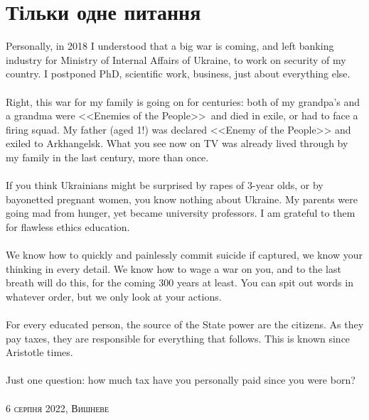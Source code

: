 \section{Тільки одне питання}

Personally, in 2018 I understood that a big war is coming, and left banking
industry for Ministry of Internal Affairs of Ukraine, to work on security
of my country. I postponed PhD, scientific work, business, just about everything else.
\\
\\
Right, this war for my family is going on for centuries: both of my
grandpa's and a grandma were <<Enemies of the People>>\, and died in exile,
or had to face a firing squad. My father (aged 1!) was
declared <<Enemy of the People>> and exiled to Arkhangelsk.
What you see now on TV was already lived through by my family in the
last century, more than once.
\\
\\
If you think Ukrainians might be surprised by rapes of 3-year olds,
or by bayonetted pregnant women, you know nothing about Ukraine.
My parents were going mad from hunger, yet became university professors.
I am grateful to them for flawless ethics education.
\\
\\
We know how to quickly and painlessly commit suicide if captured, we know
your thinking in every detail. We know how to wage a war on you, and to
the last breath will do this, for the coming 300 years at least.
You can spit out words in whatever order, but we only look at your actions.
\\
\\
For every educated person, the source of the State power are the citizens.
As they pay taxes, they are responsible for everything that follows.
This is known since Aristotle times.
\\
\\
Just one question: how much tax have you personally paid since you were born?
\\
\\
\textsc{\footnotesize 6 серпня 2022, Вишневе}

\normalsize
